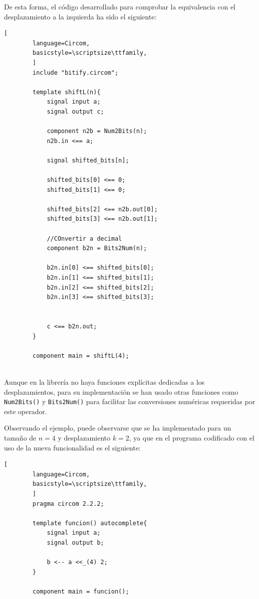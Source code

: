\documentclass[a4paper,12pt]{report}
\begin{document}
	\vspace{0.2cm}
	\noindent De esta forma, el código desarrollado para comprobar la equivalencia con el desplazamiento a la izquierda ha sido el siguiente:
	
	\vspace{0.2cm}
	\begin{lstlisting}[
		language=Circom,
		basicstyle=\scriptsize\ttfamily, 
		]
		include "bitify.circom";
		
		template shiftL(n){
			signal input a;
			signal output c;
			
			component n2b = Num2Bits(n);
			n2b.in <== a;
			
			signal shifted_bits[n];
			
			shifted_bits[0] <== 0;
			shifted_bits[1] <== 0;
			
			shifted_bits[2] <== n2b.out[0];
			shifted_bits[3] <== n2b.out[1];
			
			//COnvertir a decimal
			component b2n = Bits2Num(n);
			
			b2n.in[0] <== shifted_bits[0];
			b2n.in[1] <== shifted_bits[1];
			b2n.in[2] <== shifted_bits[2];
			b2n.in[3] <== shifted_bits[3];
			
			
			c <== b2n.out;
		}
		
		component main = shiftL(4);
		
	\end{lstlisting}
	
	\vspace{0.2cm}
	\noindent Aunque en la librería no haya funciones explícitas dedicadas a los desplazamientos, para su implementación se han usado otras funciones como \texttt{Num2Bits()} y \texttt{Bits2Num()} para facilitar las conversiones numéricas requeridas por este operador.
	
	\vspace{0.2cm}
	\noindent Observando el ejemplo, puede observarse que se ha implementado para un tamaño de $n=4$ y desplazamiento $k=2$, ya que en el programa codificado con el uso de la nueva funcionalidad es el siguiente:
	
	\vspace{0.2cm}
	\begin{lstlisting}[
		language=Circom,
		basicstyle=\scriptsize\ttfamily, 
		]
		pragma circom 2.2.2;
		
		template funcion() autocomplete{
			signal input a;
			signal output b;
			
			b <-- a <<_(4) 2;
		}
		
		component main = funcion();
		
	\end{lstlisting}
	
\end{document}
